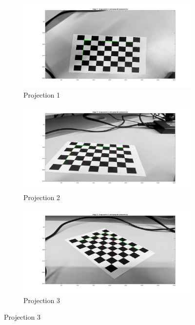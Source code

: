 \documentclass[12pt, twoside]{report}
\begin{document}
\begin{enumerate}
\begin{figure}[H]
     \centering
     \begin{subfigure}[b]{0.3\textwidth}
         \centering
         \includegraphics[width=\textwidth]{images/prj1.jpg}
         \caption{Projection 1}
         \label{fig:fig31_cal}
     \end{subfigure}
     \hfill
     \begin{subfigure}[b]{0.3\textwidth}
         \centering
         \includegraphics[width=\textwidth]{images/prj2.jpg}
         \caption{Projection 2}
         \label{fig:fig32_cal}
     \end{subfigure}
     \hfill
     \begin{subfigure}[b]{0.3\textwidth}
         \centering
         \includegraphics[width=\textwidth]{images/prj3.jpg}
         \caption{Projection 3}
         \label{fig:fig33_cal}
     \end{subfigure}
     \hfill
 

\end{figure}
\end{enumerate}
\end{document}
